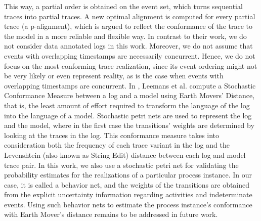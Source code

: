 This way, a partial order is obtained on the event set, which turns sequential traces into partial traces.
A new optimal alignment is computed for every partial trace (a p-alignment), which is argued to reflect the conformance of the trace to the model in a more reliable and flexible way.
In contrast to their work, we do not consider data annotated logs in this work.
Moreover, we do not assume that events with overlapping timestamps are necessarily concurrent.
Hence, we do not focus on the most conforming trace realization, since its event ordering might not be very likely or even represent reality, as is the case when events with overlapping timestamps are concurrent.
In \cite{earth}, Leemans et al. compute a Stochastic Conformance Measure between a log and a model using Earth Movers' Distance, that is, the least amount of effort required to transform the language of the log into the language of a model.
Stochastic petri nets are used to represent the log and the model, where in the first case the transitions' weights are determined by looking at the traces in the log.
This conformance measure takes into consideration both the frequency of each trace variant in the log and the Levenshtein (also known as String Edit) distance between each log and model trace pair.
In this work, we also use a stochastic petri net for validating the probability estimates for the realizations of a particular process instance.
In our case, it is called a behavior net, and the weights of the transitions are obtained from the explicit uncertainty information regarding activities and indeterminate events.
Using such behavior nets to estimate the process instance's conformance with Earth Mover's distance remains to be addressed in future work.